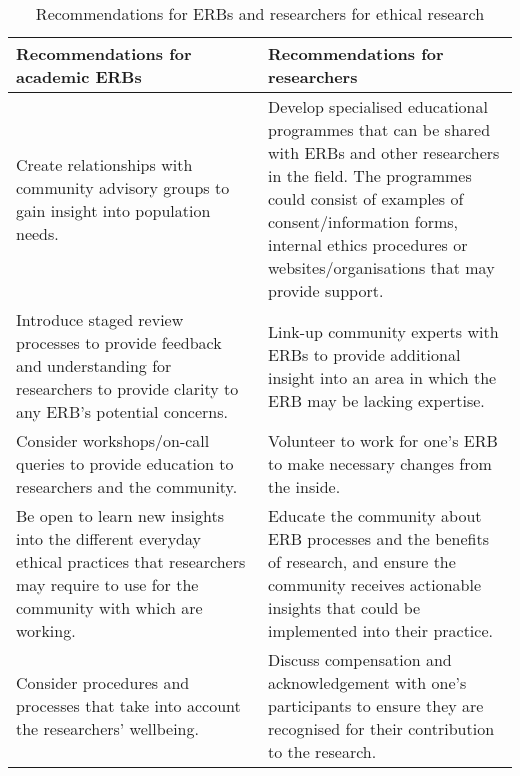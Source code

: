 \begin{table}[ht]
\renewcommand{\arraystretch}{1.7}
\centering
\begin{tabular}{p{0.5\linewidth} | p{0.5\linewidth}}
\textbf{Recommendations for academic ERBs} &
  \textbf{Recommendations for researchers} \\ \hline
Create relationships with community advisory groups to gain insight into population needs. &
  Develop specialised educational programmes that can be shared with ERBs and other researchers in the field. The programmes could consist of examples of consent/information forms, internal ethics procedures or websites/organisations that may provide support. \\ \hline
Introduce staged review processes to provide feedback and understanding for researchers to provide clarity to any ERB's potential concerns. &
Link-up community experts with ERBs to provide additional insight into an area in which the ERB may be lacking expertise. \\ \hline
Consider workshops/on-call queries to provide education to researchers and the community. &
Volunteer to work for one's ERB to make necessary changes from the inside. \\ \hline
Be open to learn new insights into the different everyday ethical practices that researchers may require to use for the community with which are working. &
Educate the community about ERB processes and the benefits of research, and ensure the community receives actionable insights that could be implemented into their practice. \\ \hline
Consider procedures and processes that take into account the researchers' wellbeing. &
  Discuss compensation and acknowledgement with one's participants to ensure they are recognised for their contribution to the research. \\ \hline
\end{tabular}
\caption{Recommendations for ERBs and researchers for ethical research}
\label{tab:ethicRecommendations}

\end{table}


